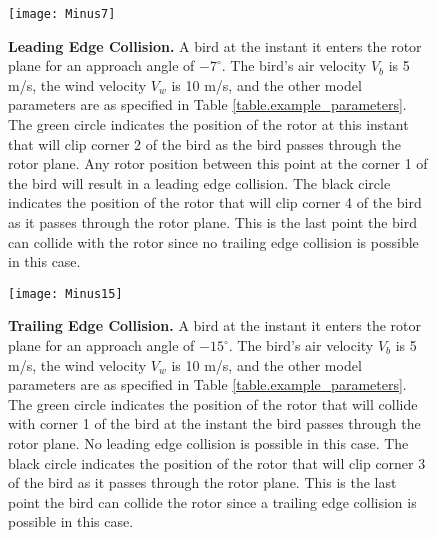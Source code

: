 \label{} \documentclass[10pt,conference]{IEEEtran}
\begin{document}
\begin{figure}
   \centering
   \texttt{[image: Minus7]}
   \caption{\textbf{Leading Edge Collision.} A bird at the instant it enters the rotor plane for an approach angle of $-7^\circ$. The bird's air velocity $V_b$ is 5
m/s, the wind velocity $V_w$ is 10 m/s, and the other model parameters are as specified in Table
\ref{table.example_parameters}. The green circle indicates the position of the rotor at this instant that will clip
corner 2 of the bird as the bird passes through the rotor plane. Any rotor position between this point at the corner 1
of the bird will result in a leading edge collision. The black circle indicates the position of the rotor that will
clip corner 4 of the bird as it passes through the rotor plane. This is the last point the bird can collide with the
rotor since no trailing edge collision is possible in this case.}
   \label{fig.Minus7}
   \end{figure}


\begin{figure}
   \centering
   \texttt{[image: Minus15]}
   \caption{\textbf{Trailing Edge Collision.} A bird at the instant it enters the rotor plane for an approach angle of $-15^\circ$. The bird's air velocity $V_b$ is 5
m/s, the wind velocity $V_w$ is 10 m/s, and the other model parameters are as specified in Table
\ref{table.example_parameters}. The green circle indicates the position of the rotor that will collide with corner 1 of
the bird at the instant the bird passes through the rotor plane. No leading edge collision is possible in this case.
The black circle indicates the position of the rotor that will clip corner 3 of the bird as it passes through the rotor
plane. This is the last point the bird can collide the rotor since a trailing edge collision is possible in this case.}
   \label{fig.Minus15}
   \end{figure}
\end{document}
